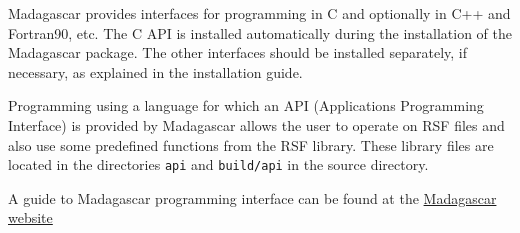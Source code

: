 Madagascar provides interfaces for programming in C and optionally in C++ and Fortran90, etc. The C API is installed automatically during the installation of the Madagascar package. The other interfaces should be installed separately, if necessary, as explained in the installation guide.

Programming using a language for which an API (Applications Programming Interface) is provided by Madagascar allows the user to operate on RSF files and also use some predefined functions from the RSF library. These library files are located in the directories \texttt{api} and \texttt{build/api} in the source directory. 

A guide to Madagascar programming interface can be found at the 
\href{http://www.reproducibility.org/wiki/Guide_to_madagascar_API}{Madagascar website}



